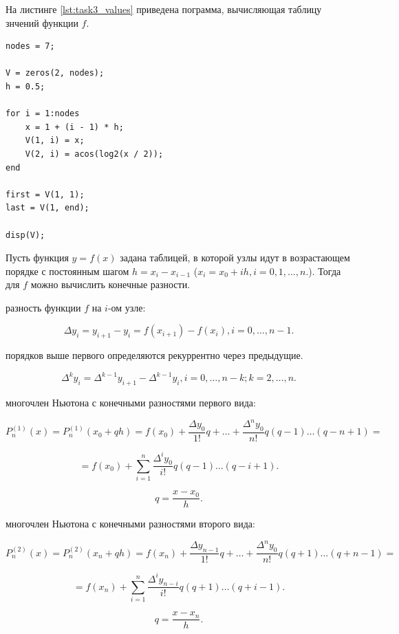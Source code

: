 На листинге \ref{lst:task3_values} приведена пограмма, вычисляющая таблицу знчений функции $f$.

\begin{listing}[H]
\caption{Вычисление таблицы значений для функции $f(x) = \arccos(\log_2(\frac{x}{2}))$}
\vspace{-20pt}
\label{lst:task3_values}
\begin{verbatim}
nodes = 7;

V = zeros(2, nodes);
h = 0.5;

for i = 1:nodes
    x = 1 + (i - 1) * h;
    V(1, i) = x;
    V(2, i) = acos(log2(x / 2));
end

first = V(1, 1);
last = V(1, end);

disp(V);
\end{verbatim}
\end{listing}


Пусть функция $y = f(x)$ задана таблицей, в которой узлы идут в возрастающем порядке с постоянным шагом $h = x_i - x_{i-1}$ ($x_i = x_0 + ih, i = 0, 1, \dots, n.$). Тогда для $f$ можно вычислить конечные разности.

 разность функции $f$ на $i$-ом узле:

\[
\Delta y_i = y_{i+1} - y_i = f(x_{i+1}) - f(x_i), i = 0, \dots, n-1.
\]

 порядков выше первого определяются рекуррентно через предыдущие.

\[
\Delta^k y_i = \Delta^{k-1} y_{i+1} - \Delta^{k-1} y_i, i = 0, \dots, n-k; k = 2, \dots, n.
\]

 многочлен Ньютона с конечными разностями первого вида:

\[
P_n^{(1)}(x) = P_n^{(1)}(x_0 + qh) = f(x_0) + \frac{\Delta y_0}{1!}q + \dots + \frac{\Delta^n y_0}{n!}q(q-1)\dots(q-n+1) =
\]

\[
= f(x_0) + \sum_{i = 1}^{n} \frac{\Delta^i y_0}{i!}q(q-1)\dots(q-i+1).
\]

\[
q = \frac{x-x_0}{h}.
\]

 многочлен Ньютона с конечными разностями второго вида:

\[
P_n^{(2)}(x) = P_n^{(2)}(x_n + qh) = f(x_n) + \frac{\Delta y_{n-1}}{1!}q + \dots + \frac{\Delta^n y_0}{n!}q(q+1)\dots(q+n-1) =
\]

\[
= f(x_n) + \sum_{i = 1}^{n} \frac{\Delta^i y_{n-i}}{i!}q(q+1)\dots(q+i-1).
\]

\[
q = \frac{x-x_n}{h}.
\]

